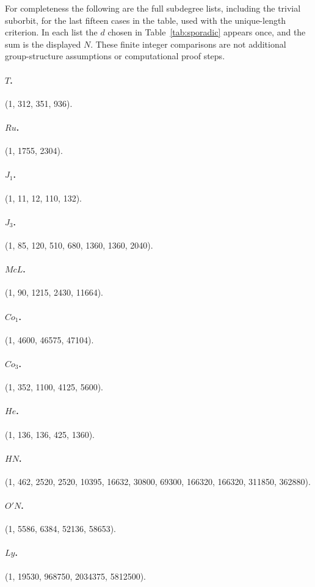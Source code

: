 \documentclass[11pt]{article}
\theoremstyle{definition}
\begin{document}
For completeness the following are the full subdegree lists, including the trivial suborbit, for the last fifteen cases in the table, used with the unique-length criterion. In each list the $d$ chosen in Table~\ref{tab:sporadic} appears once, and the sum is the displayed $N$. These finite integer comparisons are not additional group-structure assumptions or computational proof steps.
\paragraph{$T$.} (1, 312, 351, 936).
\paragraph{$Ru$.} (1, 1755, 2304).
\paragraph{$J_1$.} (1, 11, 12, 110, 132).
\paragraph{$J_3$.} (1, 85, 120, 510, 680, 1360, 1360, 2040).
\paragraph{$McL$.} (1, 90, 1215, 2430, 11664).
\paragraph{$Co_1$.} (1, 4600, 46575, 47104).
\paragraph{$Co_3$.} (1, 352, 1100, 4125, 5600).
\paragraph{$He$.} (1, 136, 136, 425, 1360).
\paragraph{$HN$.} (1, 462, 2520, 2520, 10395, 16632, 30800, 69300, 166320, 166320, 311850, 362880).
\paragraph{$O'N$.} (1, 5586, 6384, 52136, 58653).
\paragraph{$Ly$.} (1, 19530, 968750, 2034375, 5812500).
\end{document}

